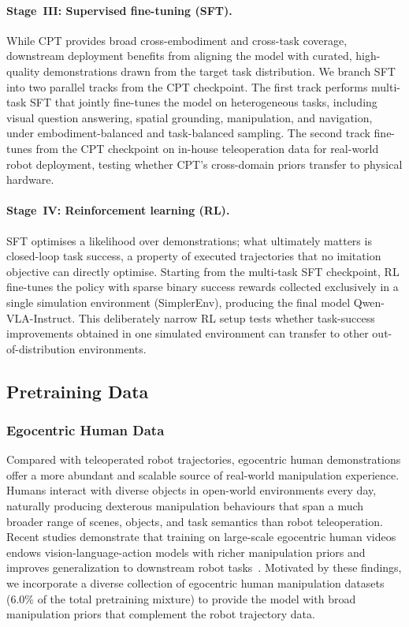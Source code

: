 \documentclass{article}
\begin{document}
  
  \paragraph{Stage~III: Supervised fine-tuning (SFT).}
  While CPT provides broad cross-embodiment and cross-task coverage,
  downstream deployment benefits from aligning the model with curated,
  high-quality demonstrations drawn from the target task distribution.
  We branch SFT into two parallel tracks from the CPT checkpoint.
  The first track performs multi-task SFT that jointly fine-tunes the model on heterogeneous tasks, including visual
  question answering, spatial grounding, manipulation, and navigation, under
  embodiment-balanced and task-balanced sampling.
  The second track fine-tunes from the CPT checkpoint on in-house
  teleoperation data for real-world robot deployment, testing whether CPT's
  cross-domain priors transfer to physical hardware.

  \paragraph{Stage~IV: Reinforcement learning (RL).}
  SFT optimises a likelihood over demonstrations; what ultimately matters is
  closed-loop task success, a property of executed trajectories that no
  imitation objective can directly optimise.
  Starting from the multi-task SFT checkpoint, RL
  fine-tunes the policy with sparse binary success rewards collected
  exclusively in a single simulation environment (SimplerEnv), producing the
  final model Qwen-VLA-Instruct.
  This deliberately narrow RL setup tests whether task-success improvements
  obtained in one simulated environment can transfer to other
  out-of-distribution environments.
  
\subsection{Pretraining Data}


\subsubsection{Egocentric Human Data}
\label{sec:ego-data}

Compared with teleoperated robot trajectories, egocentric human demonstrations
offer a more abundant and scalable source of real-world manipulation
experience.
Humans interact with diverse objects in open-world environments every day,
naturally producing dexterous manipulation behaviours that span a much broader
range of scenes, objects, and task semantics than robot teleoperation.
Recent studies demonstrate that training on large-scale egocentric human videos endows vision-language-action models with richer manipulation priors and improves generalization to downstream robot tasks~\citep{kareer2025egomimic,luo2025beingh0,li2025vitra,luo2026beingh05,zheng2026egoscale,hu2026finevlafinegrainedinstructionalignment}.
Motivated by these findings, we incorporate a diverse collection of egocentric
human manipulation datasets (6.0\% of the total pretraining mixture) to
provide the model with broad manipulation priors that complement the robot
trajectory data.
\end{document}
